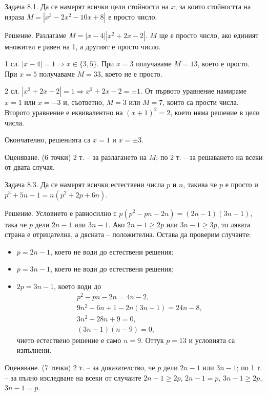 
Задача 8.1. Да се намерят всички цели стойности на $x$, за които стойността на израза $M=|x^3-2x^2-10x+8|$ е просто число.

Решение. Разлагаме $M=|x-4|\left|x^{2}+2x-2\right|$. $M$ ще е просто число, ако единият множител е равен на 1, а другият е просто число.

1 сл. $|x-4|=1 \Rightarrow x \in\{3,5\}$. При $x=3$ получаваме $M=13$, което е просто. При $x=5$ получаваме $M=33$, което не е просто.

2 сл. $\left|x^{2}+2x-2\right|=1 \Rightarrow x^{2}+2x-2=\pm1$. От първото уравнение намираме $x=1$ или $x=-3$ и, съответно, $M=3$ или $M=7$, които са прости числа. Второто уравнение е еквивалентно на $(x+1)^{2}=2$, което няма решение в цели числа.

Окончателно, решенията са $x=1$ и $x=\pm3$.

Оценяване. (6 точки) 2 т. – за разлагането на $M$; по 2 т. – за решаването на всеки от двата случая.

Задача 8.3. Да се намерят всички естествени числа $p$ и $n$, такива че $p$ е просто и $p^3+5n-1=n(p^2+2p+6n)$.

Решение. Условието е равносилно с $p\left(p^{2}-pn-2n\right)=(2n-1)(3n-1)$, така че $p$ дели $2n-1$ или $3n-1$. Ако $2n-1\geq2p$ или $3n-1\geq3p$, то лявата страна е отрицателна, а дясната – положителна. Остава да проверим случаите:
\begin{itemize}
\item $p=2n-1$, което не води до естествени решения;
\item $p=3n-1$, което не води до естествени решения;
\item $2p=3n-1$, което води до
$$
\begin{gathered}
p^{2}-pn-2n=4n-2,\\
9n^{2}-6n+1-2n(3n-1)=24n-8,\\
3n^{2}-28n+9=0,\\
(3n-1)(n-9)=0,
\end{gathered}
$$
чието естествено решение е само $n=9$. Оттук $p=13$ и условията са изпълнени.
\end{itemize}

Оценяване. (7 точки) 2 т. – за доказателство, че $p$ дели $2n-1$ или $3n-1$; по 1 т. – за пълно изследване на всеки от случаите $2n-1 \geq 2p$, $2n-1=p$, $3n-1 \geq 2p$, $3n-1=p$.
